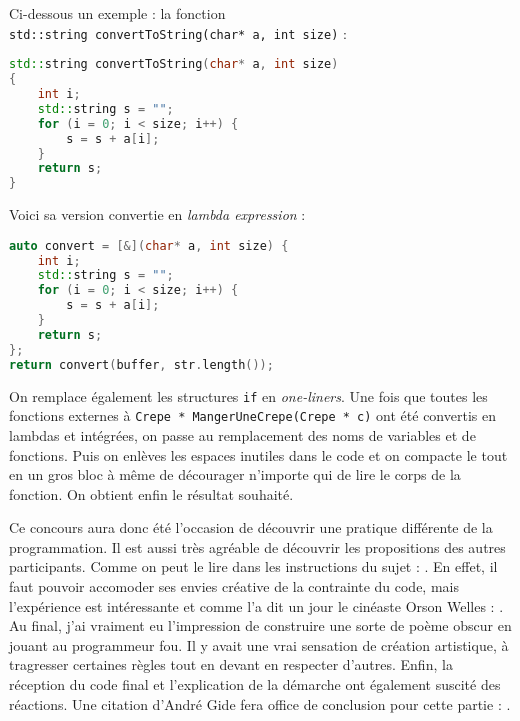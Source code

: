 \documentclass[12pt]{article} %
\begin{document}
Ci-dessous un exemple : la fonction \\ \verb|std::string convertToString(char* a, int size)| :
\begin{lstlisting}[language=C++]
std::string convertToString(char* a, int size)
{
    int i;
    std::string s = "";
    for (i = 0; i < size; i++) {
        s = s + a[i];
    }
    return s;
} 
\end{lstlisting}

Voici sa version convertie en \textit{lambda expression} :
\begin{lstlisting}[language=C++]
auto convert = [&](char* a, int size) {
    int i;
    std::string s = "";
    for (i = 0; i < size; i++) {
        s = s + a[i];
    }
    return s;
};
return convert(buffer, str.length());
\end{lstlisting}

On remplace également les structures \verb|if| en \textit{one-liners}. Une fois que toutes les fonctions externes à \verb|Crepe * MangerUneCrepe(Crepe * c)| ont été convertis en lambdas et intégrées, on passe au remplacement des noms de variables et de fonctions. Puis on enlèves les espaces inutiles dans le code et on compacte le tout en un gros bloc à même de décourager n'importe qui de lire le corps de la fonction. On obtient enfin le résultat souhaité.

Ce concours aura donc été l'occasion de découvrir une pratique différente de la programmation. Il est aussi très agréable de découvrir les propositions des autres participants. Comme on peut le lire dans les instructions du sujet :  \cite{movaicode-enonce8}. En effet, il faut pouvoir accomoder ses envies créative de la contrainte du code, mais l'expérience est intéressante et comme l'a dit un jour le cinéaste Orson Welles :  \cite{NKroll-artquote}. Au final, j'ai vraiment eu l'impression de construire une sorte de poème obscur en jouant au programmeur fou. Il y avait une vrai sensation de création artistique, à tragresser certaines règles tout en devant en respecter d'autres. Enfin, la réception du code final et l'explication de la démarche ont également suscité des réactions. Une citation d'André Gide fera office de conclusion pour cette partie :  \cite{LeFigaro-artquote}.
\begin{lstlisting}[language=C++]

\end{lstlisting}
\end{document}
